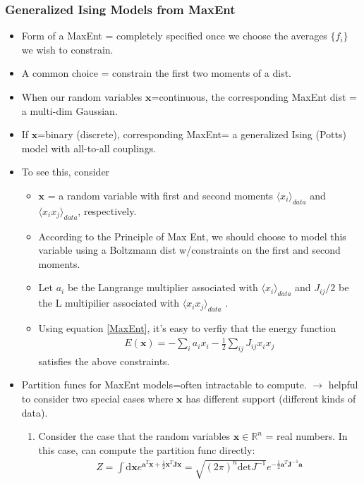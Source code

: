 \documentclass[norsk,a4paper,11pt]{article}
\begin{document}
\subsubsection{Generalized Ising Models from MaxEnt}
\begin{itemize}
	\item Form of a MaxEnt = completely specified once we choose the averages $\{ f_i \}$ we wish to constrain. 
	\item A common choice = constrain the first two moments of a dist. 
	\item When our random variables $\bm{x}$=continuous, the corresponding MaxEnt dist = a multi-dim Gaussian.  
	\item If $\bm{x}$=binary (discrete), corresponding MaxEnt= a generalized Ising (Potts) model with all-to-all couplings.
	\item To see this, consider
	\begin{itemize}
		\item $\bm{x}$ = a random variable with first and second moments $\langle x_i \rangle_{data}$ and $\langle x_i x_j \rangle_{data}$, respectively.
		\item According to the Principle of Max Ent, we should choose to model this variable using a Boltzmann dist w/constraints on the first and second moments.
		\item Let $a_i$ be the Langrange multiplier associated with $\langle x_i \rangle_{data}$ and $J_{ij}/2$ be the L multipilier associated with $\langle x_i x_j \rangle_{data}$ .
		\item Using equation \ref{MaxEnt}, it's easy to verfiy that the energy function
		\begin{align}
			E(\bm{x}) = -\sum_i a_i x_i - \frac{1}{2} \sum_{ij} J_{ij} x_i x_j
		\end{align}
		satisfies the above constraints.
	\end{itemize}
	\item Partition funcs for MaxEnt models=often intractable to compute. $\rightarrow$ helpful to consider two special cases where $\bm{x}$ has different support (different kinds of data). 
	\begin{enumerate}
		\item Consider the case that the random variables $\bm{x} \in \mathbb{R}^n$ = real numbers. In this case, can compute the partition func directly:
		\begin{align}
			Z = \int \text{d} \bm{x} e^{\bm{a}^T \bm{x} + \frac{1}{2} \bm{x}^T \bm{J}\bm{x} } = \sqrt{(2\pi)^n \text{det} J^{-1}} e^{-\frac{1}{2} \bm{a}^T \bm{J}^{-1} \bm{a}}

\end{align}
\end{enumerate}
\end{itemize}
\end{document}
